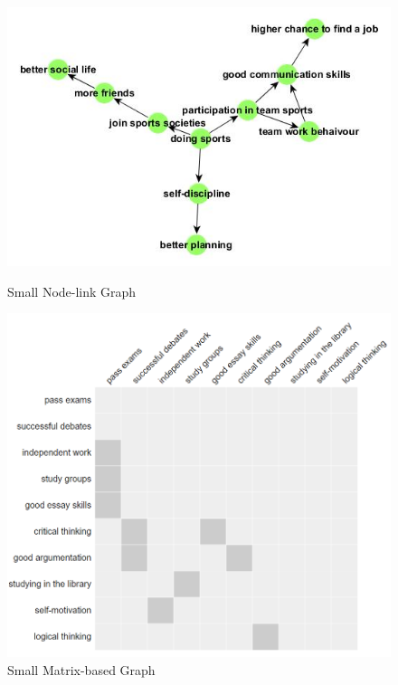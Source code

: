 \documentclass{l4proj}
\begin{document}
\begin{figure}[tbp]
  \centering
  \begin{minipage}[b]{0.4\textwidth}
    \includegraphics[width=\textwidth]{images/sportSmallOrganic.jpg}
    \caption{Small Node-link Graph}
	\label{sportSmallOrganicS}
  \end{minipage}
  \hfill
  \begin{minipage}[b]{0.4\textwidth}
    \includegraphics[width=\textwidth]{images/studentSmallInDD.PNG}
    \caption{Small Matrix-based Graph}
	\label{studentSmallInDDS}
  \end{minipage}
\end{figure}
\end{document}
